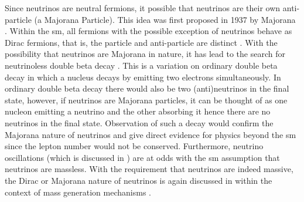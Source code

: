Since neutrinos are neutral fermions, it possible that neutrinos are their own anti-particle (a Majorana Particle). This idea was first proposed in 1937 by Majorana \cite{Majorana2020}. Within the \Gls{sm}, all fermions with the possible exception of neutrinos behave as Dirac fermions, that is, the particle and anti-particle are distinct \cite{dirac_majorana_neutrinos}. With the possibility that neutrinos are Majorana in nature, it has lead to the search for neutrinoless double beta decay \cite{Double_beta_decay}. This is a variation on ordinary double beta decay in which a nucleus decays by emitting two electrons simultaneously. In ordinary double beta decay there would also be two (anti)neutrinos in the final state, however, if neutrinos are Majorana particles, it can be thought of as one nucleon emitting a neutrino and the other absorbing it hence there are no neutrinos in the final state. Observation of such a decay would confirm the Majorana nature of neutrinos and give direct evidence for physics beyond the \Gls{sm} since the lepton number would not be conserved. Furthermore, neutrino oscillations (which is discussed in ) are at odds with the \gls{sm} assumption that neutrinos are massless. With the requirement that neutrinos are indeed massive, the Dirac or Majorana nature of neutrinos is again discussed in  within the context of mass generation mechanisms \cite{The_physics_of_neutrinos_book}.

